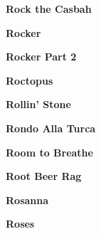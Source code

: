 \newline
\vspace{10pt} 
\begin{center}\textbf{Rock the Casbah}\end{center}
\newline
\vspace{10pt} 
\begin{center}\textbf{Rocker}\end{center}
\newline
\vspace{10pt} 
\begin{center}\textbf{Rocker Part 2}\end{center}
\newline
\vspace{10pt} 
\begin{center}\textbf{Roctopus}\end{center}
\newline
\vspace{10pt} 
\begin{center}\textbf{Rollin' Stone}\end{center}
\newline
\vspace{10pt} 
\begin{center}\textbf{Rondo Alla Turca}\end{center}
\newline
\vspace{10pt} 
\begin{center}\textbf{Room to Breathe}\end{center}
\newline
\vspace{10pt} 
\begin{center}\textbf{Root Beer Rag}\end{center}
\newline
\vspace{10pt} 
\begin{center}\textbf{Rosanna}\end{center}
\newline
\vspace{10pt} 
\begin{center}\textbf{Roses}\end{center}
